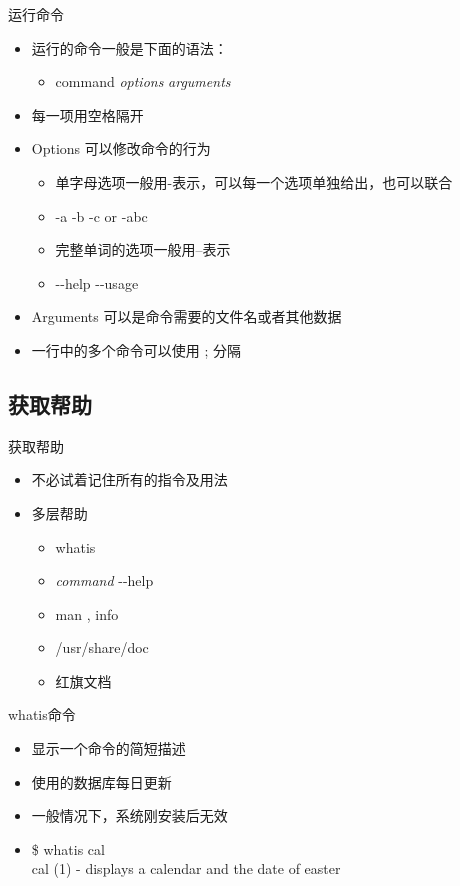 \begin{frame}{运行命令}
\begin{itemize}
\item 运行的命令一般是下面的语法：

\begin{itemize}
\item command \textit{options} \textit{arguments}
\end{itemize}
\item 每一项用空格隔开
\item Options 可以修改命令的行为

\begin{itemize}
\item 单字母选项一般用-表示，可以每一个选项单独给出，也可以联合
\item -a -b -c or -abc
\item 完整单词的选项一般用--表示
\item -{}-help -{}-usage
\end{itemize}
\item Arguments 可以是命令需要的文件名或者其他数据
\item 一行中的多个命令可以使用 ; 分隔
\end{itemize}

\end{frame}

\subsection{获取帮助}


\begin{frame}{获取帮助}
\begin{itemize}
\item 不必试着记住所有的指令及用法
\item 多层帮助

\begin{itemize}
\item whatis
\item \textit{command} -{}-help
\item man , info
\item /usr/share/doc
\item 红旗文档
\end{itemize}
\end{itemize}
\end{frame}


\begin{frame}{whatis命令}
\begin{itemize}
\item 显示一个命令的简短描述
\item 使用的数据库每日更新
\item 一般情况下，系统刚安装后无效
\item \$ whatis cal\\
cal (1) - displays a calendar and the date of easter
\end{itemize}
\end{frame}


